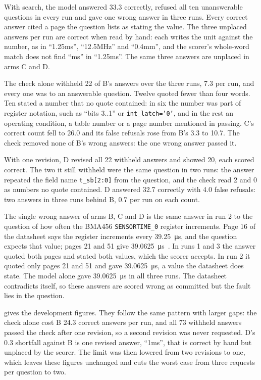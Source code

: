 With search, the model answered 33.3 correctly, refused all ten unanswerable questions in every run and gave one wrong answer in three runs. Every correct answer cited a page the question lists as stating the value. The three unplaced answers per run are correct when read by hand: each writes the unit against the number, as in \enquote{1.25ms}, \enquote{12.5MHz} and \enquote{0.4mm}, and the scorer's whole-word match does not find \enquote{ms} in \enquote{1.25ms}. The same three answers are unplaced in arms C and D.

The check alone withheld 22 of B's answers over the three runs, 7.3 per run, and every one was to an answerable question. Twelve quoted fewer than four words. Ten stated a number that no quote contained: in six the number was part of register notation, such as \enquote{bits 3..1} or \texttt{int\_latch='0'}, and in the rest an operating condition, a table number or a page number mentioned in passing. C's correct count fell to 26.0 and its false refusals rose from B's 3.3 to 10.7. The check removed none of B's wrong answers: the one wrong answer passed it.

With one revision, D revised all 22 withheld answers and showed 20, each scored correct. The two it still withheld were the same question in two runs: the answer repeated the field name \texttt{t\_sb[2:0]} from the question, and the check read 2 and 0 as numbers no quote contained. D answered 32.7 correctly with 4.0 false refusals: two answers in three runs behind B, 0.7 per run on each count.

The single wrong answer of arms B, C and D is the same answer in run 2 to the question of how often the BMA456 \texttt{SENSORTIME\_0} register increments. Page 16 of the datasheet says the register increments every \qty{39.25}{\micro\second}, and the question expects that value; pages 21 and 51 give \qty{39.0625}{\micro\second}~\cite{bma456}. In runs 1 and 3 the answer quoted both pages and stated both values, which the scorer accepts. In run 2 it quoted only pages 21 and 51 and gave \qty{39.0625}{\micro\second}, a value the datasheet does state. The model alone gave \qty{39.0625}{\micro\second} in all three runs. The datasheet contradicts itself, so these answers are scored wrong as committed but the fault lies in the question.

 gives the development figures. They follow the same pattern with larger gaps: the check alone cost B 24.3 correct answers per run, and all 73 withheld answers passed the check after one revision, so a second revision was never requested. D's 0.3 shortfall against B is one revised answer, \enquote{1ms}, that is correct by hand but unplaced by the scorer. The limit was then lowered from two revisions to one, which leaves these figures unchanged and cuts the worst case from three requests per question to two.

